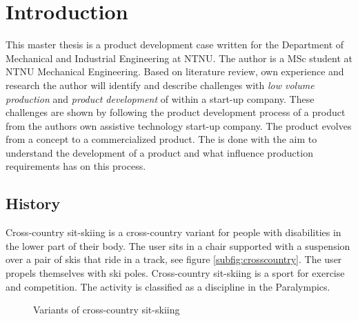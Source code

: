 \chapter{Introduction}

This master thesis is a product development case written for the Department of Mechanical
and Industrial Engineering at NTNU. The author is a MSc student at NTNU Mechanical Engineering.
Based on literature review, own experience and research the author will identify and
describe challenges with \textit{low volume production} and \textit{product development} of within a start-up company. These challenges are shown by following the product development process of a product from the authors own assistive technology start-up company. The product evolves from a concept to a commercialized product. The is done with the aim to understand the development of a product and what influence production requirements has on this process.


\section{History}
\hspace{1.5cm} Cross-country sit-skiing is a cross-country variant for people with disabilities in the lower part of their body. The user sits in a chair supported with a suspension over a pair of skis that ride in a track, see figure \ref{subfig:crosscountry}. The user propels themselves with ski poles. Cross-country sit-skiing is a sport for exercise and competition. The activity is classified as a discipline in the Paralympics.

\begin{figure}[htb!]
  \hfill
  \captionsetup{justification=centering}
  \caption{Variants of cross-country sit-skiing}\label{fig:sitski}
\end{figure}

